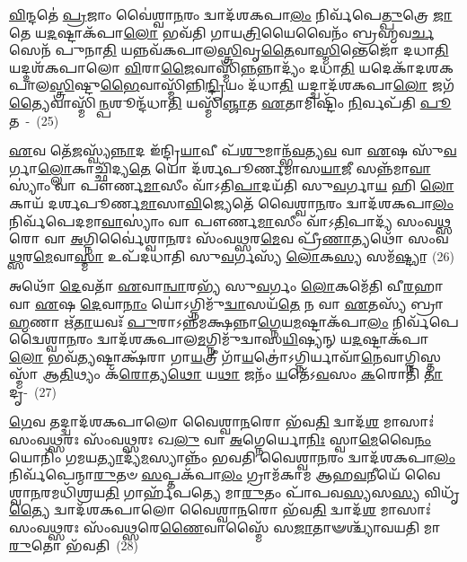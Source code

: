 \-\ul{𑌵𑌿}\-𑌨𑍍𑌦𑌤𑍇॑ \ul{𑌪𑍍𑌰}\-𑌜𑌾𑌂 𑌵𑍈॑𑌶𑍍𑌵𑌾\-\ul{𑌨}\-𑌰𑌂 𑌦𑍍𑌵𑌾𑌦᳴𑌶\-𑌕𑌪𑌾\-\ul{𑌲𑌂} 𑌨𑌿𑌰𑍍𑌵᳴𑌪𑍇\-\ul{𑌤𑍍𑌪𑍁}\-𑌤𑍍𑌰𑍇 \ul{𑌜𑌾}\-𑌤𑍇 𑌯\-\ul{𑌦}\-𑌷𑍍𑌟𑌾𑌕᳴𑌪𑌾\-\ul{𑌲𑍋} 𑌭𑌵᳴𑌤𑌿 𑌗𑌾𑌯\-\ul{𑌤𑍍𑌰𑌿}\-𑌯𑍈𑌵𑍈𑌨𑌂᳴ 𑌬𑍍𑌰𑌹𑍍𑌮𑌵\-\ul{𑌰𑍍𑌚}\-𑌸𑍇𑌨᳴ 𑌪𑍁𑌨𑌾\-\ul{𑌤𑌿} 𑌯𑌨𑍍𑌨𑌵᳴𑌕𑌪𑌾𑌲\-\ul{𑌸𑍍𑌤𑍍𑌰𑌿}\-𑌵𑍃\-\ul{𑌤𑍈}\-𑌵𑌾\-\ul{𑌸𑍍𑌮𑌿}\-𑌨𑍍𑌤𑍇𑌜𑍋᳴ 𑌦𑌧𑌾\-\ul{𑌤𑌿} 𑌯𑌦𑍍𑌦𑌶᳴\-𑌕𑌪𑌾𑌲𑍋 \ul{𑌵𑌿}\-𑌰𑌾\-\ul{𑌜𑍈}\-𑌵𑌾𑌸𑍍𑌮𑌿᳴\-\ul{𑌨𑍍𑌨}\-𑌨𑍍𑌨𑌾𑌦𑍍𑌯𑌂᳴ 𑌦𑌧𑌾\-\ul{𑌤𑌿} 𑌯𑌦𑍇𑌕𑌾᳴\-𑌦𑌶\-𑌕𑌪𑌾𑌲\-\ul{𑌸𑍍𑌤𑍍𑌰𑌿}\-𑌷𑍍𑌟𑍁\-\ul{𑌭𑍈}\-𑌵𑌾\-𑌸𑍍𑌮𑌿᳴𑌨𑍍𑌨𑌿\-\ul{𑌨𑍍𑌦𑍍𑌰𑌿}\-𑌯𑌂 𑌦᳴𑌧𑌾\-\ul{𑌤𑌿} 𑌯𑌦𑍍𑌦𑍍𑌵𑌾𑌦᳴𑌶\-𑌕𑌪𑌾\-\ul{𑌲𑍋} 𑌜𑌗᳴\-\ul{𑌤𑍍𑌯𑍈}\-𑌵𑌾𑌸𑍍𑌮𑌿᳴\-\ul{𑌨𑍍𑌪}\-𑌶𑍂𑌨𑍍𑌦᳴\-𑌧𑌾\-\ul{𑌤𑌿} 𑌯𑌸𑍍𑌮𑌿᳴\-\ul{𑌞𑍍𑌜𑌾}\-𑌤 \ul{𑌏}\-𑌤𑌾𑌮𑌿𑌷𑍍𑌟𑌿𑌂᳴ \ul{𑌨𑌿}\-𑌰𑍍𑌵𑌪᳴𑌤𑌿 \ul{𑌪𑍂}\-𑌤~-~(25)

\-\ul{𑌏}\-𑌵 𑌤𑍇᳴\-\ul{𑌜}\-𑌸𑍍𑌵𑍍𑌯᳴\-\ul{𑌨𑍍𑌨𑌾}\-𑌦 𑌇᳴𑌨𑍍𑌦𑍍𑌰𑌿\-\ul{𑌯𑌾}\-𑌵𑍀 𑌪᳴\-\ul{𑌶𑍁}\-𑌮𑌾𑌨𑍍𑌭᳴\-\ul{𑌵}\-𑌤𑍍𑌯\-\ul{𑌵} 𑌵𑌾 \ul{𑌏}\-𑌷 𑌸𑍁᳴\-\ul{𑌵}\-𑌰𑍍𑌗𑌾\-\ul{𑌲𑍍𑌲𑍋}\-𑌕𑌾𑌚𑍍𑌛𑌿᳴𑌦𑍍𑌯\-\ul{𑌤𑍇} 𑌯𑍋 𑌦᳴𑌰𑍍\mbox{}𑌶𑌪𑍂𑌰𑍍𑌣𑌮𑌾𑌸\-\ul{𑌯𑌾}\-𑌜𑍀 𑌸𑌨𑍍𑌨᳴𑌮𑌾\-\ul{𑌵𑌾}\-𑌸𑍍𑌯𑌾𑌂॑ 𑌵𑌾 𑌪𑍗𑌰𑍍𑌣\-\ul{𑌮𑌾}\-𑌸𑍀𑌂 𑌵𑌾᳴\-𑌽𑌤𑌿\-\ul{𑌪𑌾}\-𑌦𑌯᳴𑌤𑌿 𑌸𑍁\-\ul{𑌵}\-𑌰𑍍𑌗𑌾\-\ul{𑌯} 𑌹𑌿 \ul{𑌲𑍋}\-𑌕𑌾𑌯᳴ 𑌦𑌰𑍍\mbox{}𑌶𑌪𑍂𑌰𑍍𑌣\-\ul{𑌮𑌾}\-𑌸𑌾\-\ul{𑌵𑌿}\-𑌜𑍍𑌯𑍇𑌤𑍇᳴ 𑌵𑍈𑌶𑍍𑌵𑌾\-\ul{𑌨}\-𑌰𑌂 𑌦𑍍𑌵𑌾𑌦᳴𑌶\-𑌕𑌪𑌾\-\ul{𑌲𑌂} 𑌨𑌿𑌰𑍍𑌵᳴𑌪𑍇𑌦𑌮𑌾\-\ul{𑌵𑌾}\-𑌸𑍍𑌯𑌾𑌂॑ 𑌵𑌾 𑌪𑍗𑌰𑍍𑌣\-\ul{𑌮𑌾}\-𑌸𑍀𑌂 𑌵𑌾᳴\-𑌽\-\ul{𑌤𑌿}\-𑌪𑌾𑌦𑍍𑌯᳴ 𑌸𑌂𑌵\-\ul{𑌥𑍍𑌸}\-𑌰𑍋 𑌵𑌾 \ul{𑌅}\-𑌗𑍍𑌨𑌿𑌰𑍍𑌵𑍈॑𑌶𑍍𑌵𑌾\-\ul{𑌨}\-𑌰𑌃 𑌸𑌂᳴𑌵\-\ul{𑌥𑍍𑌸}\-𑌰\-\ul{𑌮𑍇}\-𑌵 𑌪𑍍𑌰𑍀᳴\-\ul{𑌣𑌾}\-𑌤𑍍𑌯𑌥𑍋᳴ 𑌸𑌂𑌵\-\ul{𑌥𑍍𑌸}\-𑌰\-\ul{𑌮𑍇}\-𑌵𑌾\-\ul{𑌸𑍍𑌮𑌾} 𑌉𑌪᳴𑌦𑌧𑌾𑌤𑌿 𑌸𑍁\-\ul{𑌵}\-𑌰𑍍𑌗𑌸𑍍𑌯᳴ \ul{𑌲𑍋}\-𑌕\-\ul{𑌸𑍍𑌯} 𑌸𑌮᳴\-\ul{𑌷𑍍𑌟𑍍𑌯𑌾}\-~(26)

𑌅𑌥𑍋᳴ \ul{𑌦𑍇}\-𑌵𑌤𑌾᳴ \ul{𑌏}\-𑌵𑌾\-\ul{𑌨𑍍𑌵𑌾}\-𑌰𑌭𑍍𑌯᳴ 𑌸𑍁\-\ul{𑌵}\-𑌰𑍍𑌗𑌂 \ul{𑌲𑍋}\-𑌕𑌮𑍇᳴𑌤𑌿 𑌵𑍀\-\ul{𑌰}\-𑌹𑌾 𑌵𑌾 \ul{𑌏}\-𑌷 \ul{𑌦𑍇}\-𑌵𑌾\-\ul{𑌨𑌾𑌂} 𑌯𑍋॑\-𑌽𑌗𑍍𑌨𑌿𑌮𑍁᳴\-\ul{𑌦𑍍𑌵𑌾}\-𑌸𑌯᳴\-\ul{𑌤𑍇} 𑌨 𑌵𑌾 \ul{𑌏}\-𑌤𑌸𑍍𑌯᳴ 𑌬𑍍𑌰𑌾\-\ul{𑌹𑍍𑌮}\-𑌣𑌾 𑌋᳴\-\ul{𑌤𑌾}\-𑌯𑌵𑌃᳴ \ul{𑌪𑍁}\-𑌰𑌾\-𑌽𑌨𑍍𑌨᳴𑌮𑌕𑍍𑌷𑌨𑍍𑌨𑌾\-\ul{𑌗𑍍𑌨𑍇}\-𑌯\-\ul{𑌮}\-𑌷𑍍𑌟𑌾\-𑌕᳴𑌪𑌾\-\ul{𑌲𑌂} 𑌨𑌿𑌰𑍍𑌵᳴𑌪𑍇𑌦𑍍𑌵𑍈𑌶𑍍𑌵𑌾\-\ul{𑌨}\-𑌰𑌂 𑌦𑍍𑌵𑌾𑌦᳴𑌶\-𑌕𑌪𑌾𑌲\-\ul{𑌮}\-𑌗𑍍𑌨𑌿\-𑌮𑍁᳴𑌦𑍍𑌵𑌾𑌸\-\ul{𑌯𑌿}\-𑌷𑍍𑌯𑌨𑍍 𑌯\-\ul{𑌦}\-𑌷𑍍𑌟𑌾𑌕᳴𑌪𑌾\-\ul{𑌲𑍋} 𑌭𑌵᳴\-\ul{𑌤𑍍𑌯}\-𑌷𑍍𑌟𑌾𑌕𑍍𑌷᳴𑌰𑌾 𑌗𑌾\-\ul{𑌯}\-𑌤𑍍𑌰𑍀 𑌗𑌾᳴\-\ul{𑌯}\-𑌤𑍍𑌰𑍋॑\-𑌽𑌗𑍍𑌨𑌿𑌰𑍍𑌯𑌾𑌵𑌾᳴\-\ul{𑌨𑍇}\-𑌵𑌾𑌗𑍍𑌨𑌿𑌸𑍍𑌤𑌸𑍍𑌮𑌾᳴ 𑌆\-\ul{𑌤𑌿}\-𑌥𑍍𑌯𑌂 𑌕᳴\-\ul{𑌰𑍋}\-𑌤𑍍𑌯\-\ul{𑌥𑍋} 𑌯\-\ul{𑌥𑌾} 𑌜𑌨𑌂᳴ \ul{𑌯}\-𑌤𑍇᳴\-𑌽\-\ul{𑌵}\-𑌸𑌂 \ul{𑌕}\-𑌰𑍋𑌤𑌿᳴ \ul{𑌤𑌾}\-𑌦𑍃-~(27)

\-\ul{𑌗𑍇}\-𑌵 𑌤𑌦𑍍𑌦𑍍𑌵𑌾𑌦᳴𑌶\-𑌕𑌪𑌾𑌲𑍋 𑌵𑍈𑌶𑍍𑌵𑌾\-\ul{𑌨}\-𑌰𑍋 𑌭᳴𑌵\-\ul{𑌤𑌿} 𑌦𑍍𑌵𑌾𑌦᳴\-\ul{𑌶} 𑌮𑌾𑌸𑌾𑌃॑ 𑌸𑌂𑌵\-\ul{𑌥𑍍𑌸}\-𑌰𑌃 𑌸𑌂᳴𑌵\-\ul{𑌥𑍍𑌸}\-𑌰𑌃 𑌖\-\ul{𑌲𑍁} 𑌵𑌾 \ul{𑌅}\-𑌗𑍍𑌨𑍇𑌰𑍍𑌯𑍋\-\ul{𑌨𑌿𑌃} 𑌸𑍍𑌵𑌾\-\ul{𑌮𑍇}\-𑌵𑍈\-\ul{𑌨𑌂} 𑌯𑍋𑌨𑌿𑌂᳴ 𑌗𑌮𑌯\-\ul{𑌤𑍍𑌯𑌾}\-𑌦𑍍𑌯᳴\-\ul{𑌮}\-𑌸𑍍𑌯𑌾𑌨𑍍𑌨𑌂᳴ 𑌭𑌵𑌤𑌿 𑌵𑍈𑌶𑍍𑌵𑌾\-\ul{𑌨}\-𑌰𑌂 𑌦𑍍𑌵𑌾𑌦᳴𑌶\-𑌕𑌪𑌾\-\ul{𑌲𑌂} 𑌨𑌿𑌰𑍍𑌵᳴𑌪𑍇𑌨𑍍𑌮𑌾\-\ul{𑌰𑍁}\-𑌤𑍞 \ul{𑌸}\-𑌪𑍍𑌤𑌕᳴𑌪𑌾\-\ul{𑌲𑌂} 𑌗𑍍𑌰𑌾𑌮᳴𑌕𑌾𑌮 𑌆𑌹\-\ul{𑌵}\-𑌨𑍀𑌯𑍇᳴ 𑌵𑍈𑌶𑍍𑌵𑌾\-\ul{𑌨}\-𑌰𑌮𑌧𑌿᳴𑌶𑍍𑌰𑌯\-\ul{𑌤𑌿} 𑌗𑌾𑌰𑍍\mbox{}𑌹᳴𑌪𑌤𑍍𑌯𑍇 𑌮𑌾\-\ul{𑌰𑍁}\-𑌤𑌂 𑌪𑌾᳴𑌪𑌵\-\ul{𑌸𑍍𑌯}\-𑌸\-\ul{𑌸𑍍𑌯} 𑌵𑌿𑌧𑍃᳴\-\ul{𑌤𑍍𑌯𑍈} 𑌦𑍍𑌵𑌾𑌦᳴𑌶\-𑌕𑌪𑌾𑌲𑍋 𑌵𑍈𑌶𑍍𑌵𑌾\-\ul{𑌨}\-𑌰𑍋 𑌭᳴𑌵\-\ul{𑌤𑌿} 𑌦𑍍𑌵𑌾𑌦᳴\-\ul{𑌶} 𑌮𑌾𑌸𑌾𑌃॑ 𑌸𑌂𑌵\-\ul{𑌥𑍍𑌸}\-𑌰𑌃 𑌸𑌂᳴𑌵\-\ul{𑌥𑍍𑌸}\-𑌰𑍇\-\ul{𑌣𑍈}\-𑌵𑌾𑌸𑍍𑌮𑍈᳴ 𑌸\-\ul{𑌜𑌾}\-𑌤𑌾𑍟𑌶𑍍𑌚𑍍𑌯𑌾᳴𑌵𑌯𑌤𑌿 𑌮𑌾\-\ul{𑌰𑍁}\-𑌤𑍋 𑌭᳴𑌵𑌤𑌿~(28)

